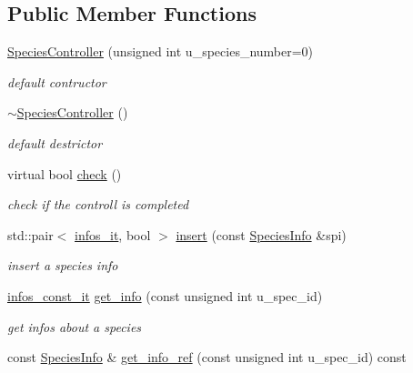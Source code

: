 \subsection*{Public Member Functions}
\begin{DoxyCompactItemize}
\item 
\hyperlink{classSpeciesController_a5af2abb109a098e7f6b2d16823d16458}{SpeciesController} (unsigned int u\_\-species\_\-number=0)
\begin{DoxyCompactList}\small\item\em default contructor \end{DoxyCompactList}\item 
\hypertarget{classSpeciesController_a0a6d3bdb642f21c63a619087ac38e073}{
\hyperlink{classSpeciesController_a0a6d3bdb642f21c63a619087ac38e073}{$\sim$SpeciesController} ()}
\label{classSpeciesController_a0a6d3bdb642f21c63a619087ac38e073}

\begin{DoxyCompactList}\small\item\em default destrictor \end{DoxyCompactList}\item 
virtual bool \hyperlink{classSpeciesController_a82ca8bb4c8f99e8b1151990ef293e39a}{check} ()
\begin{DoxyCompactList}\small\item\em check if the controll is completed \end{DoxyCompactList}\item 
\hypertarget{classSpeciesController_ae12020f4f91bc487e447fe6225bc138d}{
std::pair$<$ \hyperlink{classSpeciesController_a4026e8acb68f2b04ecc13bb20c68008a}{infos\_\-it}, bool $>$ \hyperlink{classSpeciesController_ae12020f4f91bc487e447fe6225bc138d}{insert} (const \hyperlink{structSpeciesInfo}{SpeciesInfo} \&spi)}
\label{classSpeciesController_ae12020f4f91bc487e447fe6225bc138d}

\begin{DoxyCompactList}\small\item\em insert a species info \end{DoxyCompactList}\item 
\hyperlink{classSpeciesController_a0dc92662511aca888d67516eb87b6260}{infos\_\-const\_\-it} \hyperlink{classSpeciesController_a1d9d5598574e4dc9c7023440a7a0245b}{get\_\-info} (const unsigned int u\_\-spec\_\-id)
\begin{DoxyCompactList}\small\item\em get infos about a species \end{DoxyCompactList}\item 
\hypertarget{classSpeciesController_aabe704fcc426ad3ec1ae46d0ed7e667d}{
const \hyperlink{structSpeciesInfo}{SpeciesInfo} \& \hyperlink{classSpeciesController_aabe704fcc426ad3ec1ae46d0ed7e667d}{get\_\-info\_\-ref} (const unsigned int u\_\-spec\_\-id) const }
\label{classSpeciesController_aabe704fcc426ad3ec1ae46d0ed7e667d}


\end{DoxyCompactItemize}
